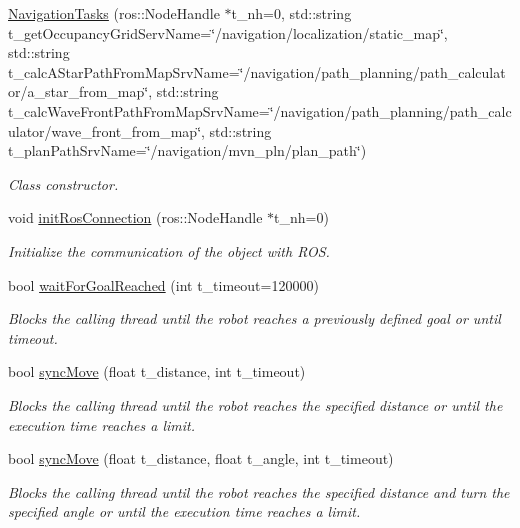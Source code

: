\begin{DoxyCompactItemize}
\item 
\hyperlink{class_navigation_tasks_addd75ee6e6e38faa8d3fe41c91ae65fc}{Navigation\+Tasks} (ros\+::\+Node\+Handle $\ast$t\+\_\+nh=0, std\+::string t\+\_\+get\+Occupancy\+Grid\+Serv\+Name=\char`\"{}/navigation/localization/static\+\_\+map\char`\"{}, std\+::string t\+\_\+calc\+A\+Star\+Path\+From\+Map\+Srv\+Name=\char`\"{}/navigation/path\+\_\+planning/path\+\_\+calculator/a\+\_\+star\+\_\+from\+\_\+map\char`\"{}, std\+::string t\+\_\+calc\+Wave\+Front\+Path\+From\+Map\+Srv\+Name=\char`\"{}/navigation/path\+\_\+planning/path\+\_\+calculator/wave\+\_\+front\+\_\+from\+\_\+map\char`\"{}, std\+::string t\+\_\+plan\+Path\+Srv\+Name=\char`\"{}/navigation/mvn\+\_\+pln/plan\+\_\+path\char`\"{})
\begin{DoxyCompactList}\small\item\em Class constructor. \end{DoxyCompactList}\item 
void \hyperlink{class_navigation_tasks_ab1bef734b1b580c7dbfb8970a4d056d2}{init\+Ros\+Connection} (ros\+::\+Node\+Handle $\ast$t\+\_\+nh=0)
\begin{DoxyCompactList}\small\item\em Initialize the communication of the object with R\+OS. \end{DoxyCompactList}\item 
bool \hyperlink{class_navigation_tasks_a347aa2db0e601217f76722b93ca3032e}{wait\+For\+Goal\+Reached} (int t\+\_\+timeout=120000)
\begin{DoxyCompactList}\small\item\em Blocks the calling thread until the robot reaches a previously defined goal or until timeout. \end{DoxyCompactList}\item 
bool \hyperlink{class_navigation_tasks_a8e479ecb29bf123422a97407158741e4}{sync\+Move} (float t\+\_\+distance, int t\+\_\+timeout)
\begin{DoxyCompactList}\small\item\em Blocks the calling thread until the robot reaches the specified distance or until the execution time reaches a limit. \end{DoxyCompactList}\item 
bool \hyperlink{class_navigation_tasks_ad71f63ebfe56a86daeeb7036af32edfe}{sync\+Move} (float t\+\_\+distance, float t\+\_\+angle, int t\+\_\+timeout)
\begin{DoxyCompactList}\small\item\em Blocks the calling thread until the robot reaches the specified distance and turn the specified angle or until the execution time reaches a limit. \end{DoxyCompactList}\item 

\end{DoxyCompactItemize}
